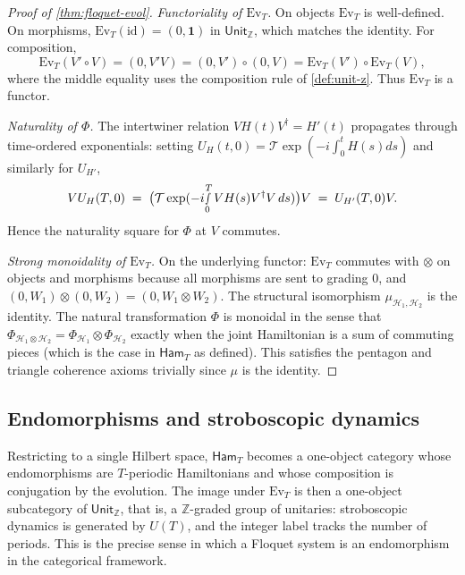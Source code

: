 \documentclass[12pt]{article}
\theoremstyle{definition}
\theoremstyle{remark}
\newcommand{\Hcal}{\mathcal{H}}
\newcommand{\Z}{\mathbb{Z}}
\newcommand{\one}{\mathbf{1}}
\newcommand{\Ham}{\mathsf{Ham}}
\begin{document}
\begin{proof}[Proof of \cref{thm:floquet-evol}]
\emph{Functoriality of $\mathrm{Ev}_T$.} On objects $\mathrm{Ev}_T$ is well-defined. On morphisms, $\mathrm{Ev}_T(\mathrm{id})=(0,\one)$ in $\mathsf{Unit}_{\Z}$, which matches the identity. For composition,
\begin{equation*}
\mathrm{Ev}_T(V'\circ V)=(0,V'V)=(0,V')\circ(0,V)=\mathrm{Ev}_T(V')\circ\mathrm{Ev}_T(V),
\end{equation*}
where the middle equality uses the composition rule of \cref{def:unit-z}. Thus $\mathrm{Ev}_T$ is a functor.

\emph{Naturality of $\Phi$.} The intertwiner relation $VH(t)V^\dagger=H'(t)$ propagates through time-ordered exponentials: setting $U_H(t,0)=\mathcal{T}\exp(-i\int_0^t H(s)ds)$ and similarly for $U_{H'}$,
\begin{equation*}
VU_H(T,0) \;=\; \bigl(\mathcal{T}\exp(-i\!\smallint_0^T VH(s)V^\dagger V\,ds)\bigr)V \;=\; U_{H'}(T,0)V.
\end{equation*}
Hence the naturality square for $\Phi$ at $V$ commutes.

\emph{Strong monoidality of $\mathrm{Ev}_T$.} On the underlying functor: $\mathrm{Ev}_T$ commutes with $\otimes$ on objects and morphisms because all morphisms are sent to grading $0$, and $(0,W_1)\otimes(0,W_2)=(0,W_1\otimes W_2)$. The structural isomorphism $\mu_{\Hcal_1,\Hcal_2}$ is the identity. The natural transformation $\Phi$ is monoidal in the sense that $\Phi_{\Hcal_1\otimes\Hcal_2}=\Phi_{\Hcal_1}\otimes\Phi_{\Hcal_2}$ exactly when the joint Hamiltonian is a sum of commuting pieces (which is the case in $\Ham_T$ as defined). This satisfies the pentagon and triangle coherence axioms trivially since $\mu$ is the identity.
\end{proof}

\subsection{Endomorphisms and stroboscopic dynamics}

Restricting to a single Hilbert space, $\Ham_T$ becomes a one-object category whose endomorphisms are $T$-periodic Hamiltonians and whose composition is conjugation by the evolution. The image under $\mathrm{Ev}_T$ is then a one-object subcategory of $\mathsf{Unit}_{\Z}$, that is, a $\Z$-graded group of unitaries: stroboscopic dynamics is generated by $U(T)$, and the integer label tracks the number of periods. This is the precise sense in which a Floquet system is an endomorphism in the categorical framework.
\end{document}
